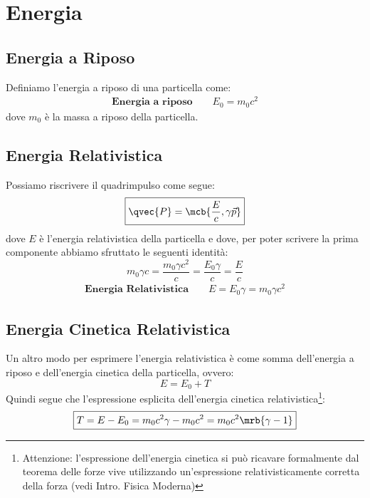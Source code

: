 \section{Energia}
\subsection{Energia a Riposo}
Definiamo l'energia a riposo di una particella come:
\begin{align}
	\textbf{Energia a riposo} \qquad \boxed{E_0 = m_0c^2}
\end{align}
dove $m_0$ è la massa a riposo della particella.

\subsection{Energia Relativistica}
Possiamo riscrivere il quadrimpulso come segue:
\begin{equation}
	\boxed{
		\qvec{P} = \mcb{\frac{E}{c}, \gamma\vec{p}}
	}
\end{equation}
dove $E$ è l'energia relativistica della particella e dove, per poter scrivere
la prima componente abbiamo sfruttato le seguenti identità:
\begin{equation}
	m_0 \gamma c = \frac{m_0 \gamma c^2}{c} = \frac{E_0\gamma}{c} = \frac{E}{c}
\end{equation}
\begin{align}
	\textbf{Energia Relativistica} \qquad \boxed{E = E_0\gamma = m_0 \gamma c^2}
\end{align}

\subsection{Energia Cinetica Relativistica}
Un altro modo per esprimere l'energia relativistica è come somma dell'energia a
riposo e dell'energia cinetica della particella, ovvero:
\begin{equation}
	E = E_0 + T
\end{equation}
Quindi segue che l'espressione esplicita dell'energia cinetica
relativistica\footnote{
	Attenzione: l'espressione dell'energia cinetica si può ricavare formalmente
	dal teorema delle forze vive utilizzando un'espressione relativisticamente
	corretta della forza (vedi Intro. Fisica Moderna)
}:
\begin{equation}
	\boxed{T = E - E_0 = m_0c^2\gamma - m_0c^2 = m_0c^2\mrb{\gamma - 1}}
\end{equation}

